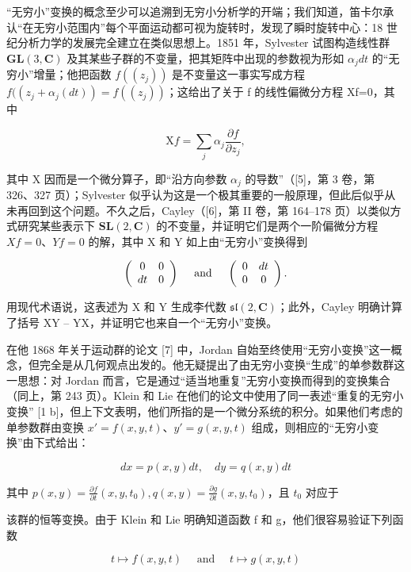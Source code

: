 “无穷小”变换的概念至少可以追溯到无穷小分析学的开端；我们知道，笛卡尔承认“在无穷小范围内”每个平面运动都可视为旋转时，发现了瞬时旋转中心：18 世纪分析力学的发展完全建立在类似思想上。1851 年，Sylvester 试图构造线性群 \(\mathbf{GL}(3,\mathbf{C})\) 及其某些子群的不变量，把其矩阵中出现的参数视为形如 \(\alpha_{j}dt\) 的“无穷小”增量；他把函数 \(f((z_{j}))\) 是不变量这一事实写成方程 \(f((z_{j}+\alpha_{j}(dt))=f((z_{j}))\)；这给出了关于 f 的线性偏微分方程 Xf=0，其中

\[
\mathrm{X} f = \sum_ {j} \alpha_ {j} \frac {\partial f}{\partial z _ {j}},\tag{1}
\]

其中 X 因而是一个微分算子，即“沿方向参数 \(\alpha_{j}\) 的导数”（{[}5{]}，第 3 卷，第 326、327 页）；Sylvester 似乎认为这是一个极其重要的一般原理，但此后似乎从未再回到这个问题。不久之后，Cayley（{[}6{]}，第 II 卷，第 164--178 页）以类似方式研究某些表示下 \(\mathbf{SL}(2,\mathbf{C})\) 的不变量，并证明它们是两个一阶偏微分方程 \(Xf=0\)、\(Yf=0\) 的解，其中 X 和 Y 如上由“无穷小”变换得到

\[
\left( \begin{array}{c c} 0 & 0 \\ d t & 0 \end{array} \right) \quad \text { and } \quad \left( \begin{array}{c c} 0 & d t \\ 0 & 0 \end{array} \right).
\]

用现代术语说，这表述为 X 和 Y 生成李代数 \(\mathfrak{sl}(2,\mathbf{C})\)；此外，Cayley 明确计算了括号 XY -- YX，并证明它也来自一个“无穷小”变换。

在他 1868 年关于运动群的论文 {[}7{]} 中，Jordan 自始至终使用“无穷小变换”这一概念，但完全是从几何观点出发的。他无疑提出了由无穷小变换“生成”的单参数群这一思想：对 Jordan 而言，它是通过“适当地重复”无穷小变换而得到的变换集合（同上，第 243 页）。Klein 和 Lie 在他们的论文中使用了同一表述“重复的无穷小变换” {[}1 b{]}，但上下文表明，他们所指的是一个微分系统的积分。如果他们考虑的单参数群由变换 \(x' = f(x, y, t)\)、\(y' = g(x, y, t)\) 组成，则相应的“无穷小变换”由下式给出：

\[
d x = p (x, y) d t, \quad d y = q (x, y) d t
\]

其中 \(p(x,y) = \frac{\partial f}{\partial t} (x,y,t_0), q(x,y) = \frac{\partial g}{\partial t} (x,y,t_0)\)，且 \(t_0\) 对应于

该群的恒等变换。由于 Klein 和 Lie 明确知道函数 f 和 g，他们很容易验证下列函数

\[
t \mapsto f (x, y, t) \quad \text { and } \quad t \mapsto g (x, y, t)
\]


